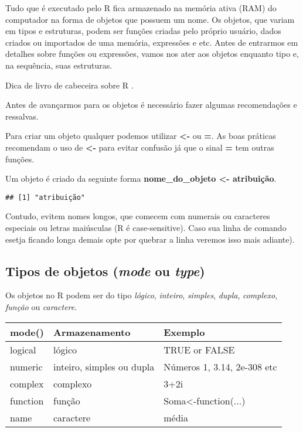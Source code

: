 \documentclass[
]{book}
\begin{document}
Tudo que é executado pelo R fica armazenado na memória ativa (RAM) do computador na forma de objetos que possuem um nome. Os objetos, que variam em tipos e estruturas, podem ser funções criadas pelo próprio usuário, dados criados ou importados de uma memória, expressões e etc. Antes de entrarmos em detalhes sobre funções ou expressões, vamos nos ater aos objetos enquanto tipo e, na sequência, suas estruturas.

Dica de livro de cabeceira sobre R \citet{melloandpeternelli2013}.

Antes de avançarmos para os objetos é necessário fazer algumas recomendações e ressalvas.

Para criar um objeto qualquer podemos utilizar \textbf{\textless-} ou \textbf{=}. As boas práticas recomendam o uso de \textbf{\textless-} para evitar confusão já que o sinal \textbf{=} tem outras funções.

Um objeto é criado da seguinte forma \textbf{nome\_do\_objeto \textless- atribuição}.

\begin{verbatim}
## [1] "atribuição"
\end{verbatim}

Contudo, evitem nomes longos, que comecem com numerais ou caracteres especiais ou letras maiúsculas (R é case-sensitive).
Caso sua linha de comando esetja ficando longa demais opte por quebrar a linha veremos isso mais adiante).

\hypertarget{tipos-de-objetos-mode-ou-type}{%
\subsection{\texorpdfstring{Tipos de objetos (\emph{mode} ou \emph{type})}{Tipos de objetos (mode ou type)}}\label{tipos-de-objetos-mode-ou-type}}

Os objetos no R podem ser do tipo \emph{lógico}, \emph{inteiro}, \emph{simples}, \emph{dupla}, \emph{complexo}, \emph{função} ou \emph{caractere}.

\begin{tabular}{l|l|l}
\hline
mode() & Armazenamento & Exemplo\\
\hline
logical & lógico & TRUE or FALSE\\
\hline
numeric & inteiro, simples ou dupla & Números 1, 3.14, 2e-308 etc\\
\hline
complex & complexo & 3+2i\\
\hline
function & função & Soma<-function(...)\\
\hline
name & caractere & média\\
\hline
\end{tabular}
\end{document}

